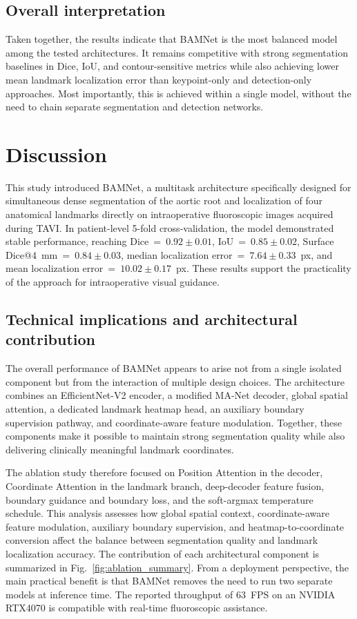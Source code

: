 \documentclass[oneside,pdflatex,sn-mathphys-num]{sn-jnl}
\begin{document}
\subsection{Overall interpretation}\label{subsec:overall}

Taken together, the results indicate that BAMNet is the most balanced model among the tested architectures. It remains competitive with strong segmentation baselines in Dice, IoU, and contour-sensitive metrics while also achieving lower mean landmark localization error than keypoint-only and detection-only approaches. Most importantly, this is achieved within a single model, without the need to chain separate segmentation and detection networks.

\section{Discussion}\label{sec:discussion}

This study introduced BAMNet, a multitask architecture specifically designed for simultaneous dense segmentation of the aortic root and localization of four anatomical landmarks directly on intraoperative fluoroscopic images acquired during TAVI. In patient-level 5-fold cross-validation, the model demonstrated stable performance, reaching Dice~=~$0.92 \pm 0.01$, IoU~=~$0.85 \pm 0.02$, Surface Dice@4~mm~=~$0.84 \pm 0.03$, median localization error~=~$7.64 \pm 0.33$~px, and mean localization error~=~$10.02 \pm 0.17$~px. These results support the practicality of the approach for intraoperative visual guidance.

\subsection{Technical implications and architectural contribution}\label{subsec:technical}

The overall performance of BAMNet appears to arise not from a single isolated component but from the interaction of multiple design choices. The architecture combines an EfficientNet-V2 encoder, a modified MA-Net decoder, global spatial attention, a dedicated landmark heatmap head, an auxiliary boundary supervision pathway, and coordinate-aware feature modulation. Together, these components make it possible to maintain strong segmentation quality while also delivering clinically meaningful landmark coordinates.

The ablation study therefore focused on Position Attention in the decoder, Coordinate Attention in the landmark branch, deep-decoder feature fusion, boundary guidance and boundary loss, and the soft-argmax temperature schedule. This analysis assesses how global spatial context, coordinate-aware feature modulation, auxiliary boundary supervision, and heatmap-to-coordinate conversion affect the balance between segmentation quality and landmark localization accuracy. The contribution of each architectural component is summarized in Fig.~\ref{fig:ablation_summary}. From a deployment perspective, the main practical benefit is that BAMNet removes the need to run two separate models at inference time. The reported throughput of 63~FPS on an NVIDIA RTX4070 is compatible with real-time fluoroscopic assistance.
\end{document}
